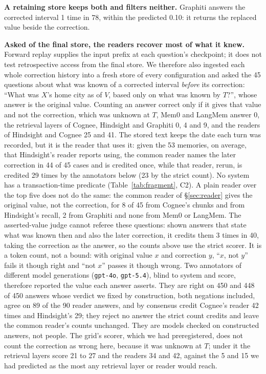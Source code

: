 \documentclass[conference]{IEEEtran}
\begin{document}
\textbf{A retaining store keeps both and filters neither.} Graphiti answers the
corrected interval 1 time in 78, within the predicted 0.10: it returns the
replaced value beside the correction.

\textbf{Asked of the final store, the readers recover most of what it knew.} Forward replay supplies the input prefix at each question's checkpoint;
it does not test retrospective access from the final store. We therefore also ingested each whole correction
history into a fresh store of every configuration and asked the 45 questions
about what was known of a corrected interval \emph{before} its correction:
``What was $X$'s home city as of $V$, based only on what was known by $T$?'',
whose answer is the original value. Counting an answer correct only if it gives
that value and not the correction, which was unknown at $T$, Mem0 and LangMem
answer 0, the retrieval layers of Cognee, Hindsight and Graphiti 0, 4 and 9,
and the readers of Hindsight and Cognee 25 and 41. The stored text keeps the
date each turn was recorded, but it is the reader that uses it: given the 53
memories, on average, that Hindsight's reader reports using, the common reader
names the later correction in 44 of 45 cases and is credited once, while that
reader, rerun, is credited 29 times by the annotators below (23 by the strict
count). No system has a
transaction-time predicate (Table~\ref{tab:fragment},
C2). A plain reader over the top five does not do the same: the common reader of
\S\ref{sec:reader} gives the original value, not the correction, for 8 of 45 from
Cognee's chunks and from Hindsight's recall, 2 from Graphiti and none from Mem0
or LangMem. The asserted-value judge cannot referee these questions: shown
answers that state what was known then and also the later correction, it
credits them 3 times in 40, taking the correction as the answer, so the counts
above use the strict scorer. It is a token count, not a bound: with original
value $x$ and correction $y$, ``$x$, not $y$'' fails it though right and
``not $x$'' passes it though wrong. Two annotators of different model
generations (\texttt{gpt-4o}, \texttt{gpt-5.4}), blind to system and score,
therefore reported the value each answer asserts. They are right on 450 and 448
of 450 answers whose verdict we fixed by construction, both negations included,
agree on 89 of the 90 reader answers, and by consensus credit Cognee's reader 42
times and Hindsight's 29; they reject no answer the strict count credits and
leave the common reader's counts unchanged. They are models checked on
constructed answers, not people. The grid's scorer, which we had
preregistered, does not count the correction as wrong here, because it was
unknown at $T$; under it the retrieval layers score 21 to 27 and the readers 34
and 42, against the 5 and 15 we had predicted as the most any retrieval layer or
reader would reach.
\end{document}
